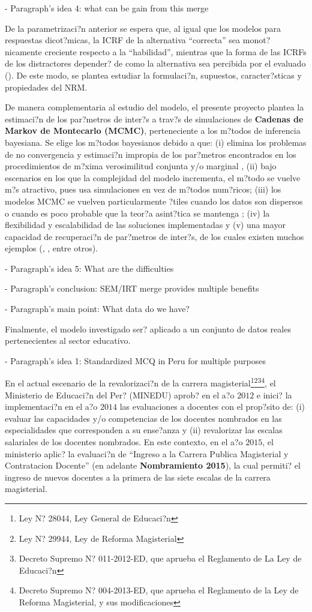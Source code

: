 - Paragraph's idea 4: what can be gain from this merge

De la parametrizaci?n anterior se espera que, al igual que los modelos para respuestas dicot?micas, la ICRF de la alternativa ``correcta'' sea monot?nicamente creciente respecto a la ``habilidad'', mientras que la forma de las ICRFs de los distractores depender? de como la alternativa sea percibida por el evaluado (\citealp{Ham_Swam1991}). De este modo, se plantea estudiar la formulaci?n, supuestos, caracter?sticas y propiedades del NRM.

De manera complementaria al estudio del modelo, el presente proyecto plantea la estimaci?n de los par?metros de inter?s a trav?s de simulaciones de \textbf{Cadenas de Markov de Montecarlo (MCMC)}, perteneciente a los m?todos de inferencia bayesiana. Se elige los m?todos bayesianos debido a que: (i) elimina los problemas de no convergencia y estimaci?n impropia de los par?metros encontrados en los procedimientos de m?xima verosimilitud conjunta y/o marginal \citep{Ham_Swam_Rog1991}, (ii) bajo escenarios en los que la complejidad del modelo incrementa, el m?todo se vuelve m?s atractivo, pues usa simulaciones en vez de m?todos num?ricos; (iii) los modelos MCMC se vuelven particularmente ?tiles cuando los datos son dispersos o cuando es poco probable que la teor?a asint?tica se mantenga \citep{Fox2010}; (iv) la flexibilidad y escalabilidad de las soluciones implementadas y (v) una mayor capacidad de recuperaci?n de par?metros de inter?s, de los cuales existen muchos ejemplos (\citealp{Hsi_Proc_Hou_Teo2010}, \citealp{Tarazona2013}, entre otros).


- Paragraph's idea 5: What are the difficulties


- Paragraph's conclusion: SEM/IRT merge provides multiple benefits





- Paragraph's main point: What data do we have?

Finalmente, el modelo investigado ser? aplicado a un conjunto de datos reales pertenecientes al sector educativo. 


- Paragraph's idea 1: Standardized MCQ in Peru for multiple purposes

En el actual escenario de la revalorizaci?n de la carrera magisterial\footnote{Ley N? 28044, Ley General de Educaci?n}\footnote{Ley N? 29944, Ley de Reforma Magisterial}\footnote{Decreto Supremo N? 011-2012-ED, que aprueba el Reglamento de La Ley de Educaci?n}\footnote{Decreto Supremo N? 004-2013-ED, que aprueba el Reglamento de la Ley de Reforma Magisterial, y sus modificaciones}, el Ministerio de Educaci?n del Per? (MINEDU) aprob? en el a?o $2012$ e inici? la implementaci?n en el a?o $2014$ las evaluaciones a docentes con el prop?sito de: (i) evaluar las capacidades y/o competencias de los docentes nombrados en las especialidades que corresponden a su ense?anza y (ii) revalorizar las escalas salariales de los docentes nombrados. En este contexto, en el a?o $2015$, el ministerio aplic? la evaluaci?n de ``Ingreso a la Carrera Publica Magisterial y Contratacion Docente'' (en adelante \textbf{Nombramiento 2015}), la cual permiti? el ingreso de nuevos docentes a la primera de las siete escalas de la carrera magisterial.


